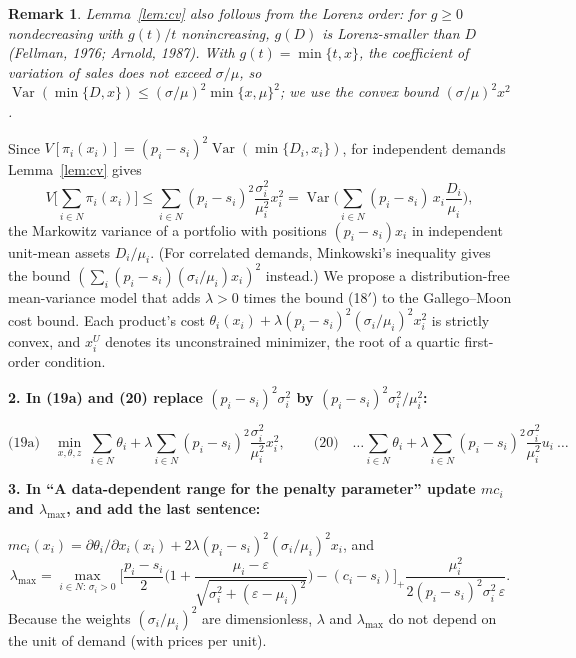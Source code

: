 \documentclass[11pt]{article}
\newtheorem*{remark}{Remark}
\newcommand{\Var}{\operatorname{Var}}
\newcommand{\edit}[1]{\par\medskip\noindent\colorbox{gray!12}{\parbox{\dimexpr\linewidth-2\fboxsep}{\small\textbf{#1}}}\par\smallskip}
\begin{document}
\begin{remark}
Lemma~\ref{lem:cv} also follows from the Lorenz order: for $g\ge0$ nondecreasing
with $g(t)/t$ nonincreasing, $g(D)$ is Lorenz-smaller than $D$ (Fellman, 1976;
Arnold, 1987). With $g(t)=\min\{t,x\}$, the coefficient of variation of sales does
not exceed $\sigma/\mu$, so
$\Var(\min\{D,x\})\le(\sigma/\mu)^2\min\{x,\mu\}^2$; we use the convex bound
$(\sigma/\mu)^2x^2$.
\end{remark}

Since $V[\pi_i(x_i)]=(p_i-s_i)^2\Var(\min\{D_i,x_i\})$, for independent demands
Lemma~\ref{lem:cv} gives
\[
V\Big[\sum_{i\in N}\pi_i(x_i)\Big]\le\sum_{i\in N}(p_i-s_i)^2\frac{\sigma_i^2}{\mu_i^2}x_i^2
=\Var\Big(\sum_{i\in N}(p_i-s_i)\,x_i\frac{D_i}{\mu_i}\Big), \tag{18$'$}
\]
the Markowitz variance of a portfolio with positions $(p_i-s_i)x_i$ in independent
unit-mean assets $D_i/\mu_i$. (For correlated demands, Minkowski's inequality gives
the bound $(\sum_i(p_i-s_i)(\sigma_i/\mu_i)x_i)^2$ instead.)
We propose a distribution-free mean-variance model that adds $\lambda>0$ times the
bound (18$'$) to the Gallego--Moon cost bound. Each product's cost
$\theta_i(x_i)+\lambda(p_i-s_i)^2(\sigma_i/\mu_i)^2x_i^2$ is strictly convex, and
$x_i^U$ denotes its unconstrained minimizer, the root of a quartic first-order
condition.

\edit{2. In (19a) and (20) replace $(p_i-s_i)^2\sigma_i^2$ by
$(p_i-s_i)^2\sigma_i^2/\mu_i^2$:}
\[
\text{(19a)}\quad \min_{x,\theta,z}\ \sum_{i\in N}\theta_i+\lambda\sum_{i\in N}(p_i-s_i)^2\frac{\sigma_i^2}{\mu_i^2}x_i^2,
\qquad
\text{(20)}\quad \ldots\sum_{i\in N}\theta_i+\lambda\sum_{i\in N}(p_i-s_i)^2\frac{\sigma_i^2}{\mu_i^2}u_i\ \ldots
\]

\edit{3. In ``A data-dependent range for the penalty parameter'' update $mc_i$ and
$\lambda_{\max}$, and add the last sentence:}

$mc_i(x_i)=\partial\theta_i/\partial x_i(x_i)+2\lambda(p_i-s_i)^2(\sigma_i/\mu_i)^2x_i$, and
\[
\lambda_{\max}=\max_{i\in N:\,\sigma_i>0}\Big[\frac{p_i-s_i}{2}\Big(1+\frac{\mu_i-\varepsilon}{\sqrt{\sigma_i^2+(\varepsilon-\mu_i)^2}}\Big)-(c_i-s_i)\Big]_+\frac{\mu_i^2}{2(p_i-s_i)^2\sigma_i^2\,\varepsilon}.
\]
Because the weights $(\sigma_i/\mu_i)^2$ are dimensionless, $\lambda$ and
$\lambda_{\max}$ do not depend on the unit of demand (with prices per unit).
\end{document}
